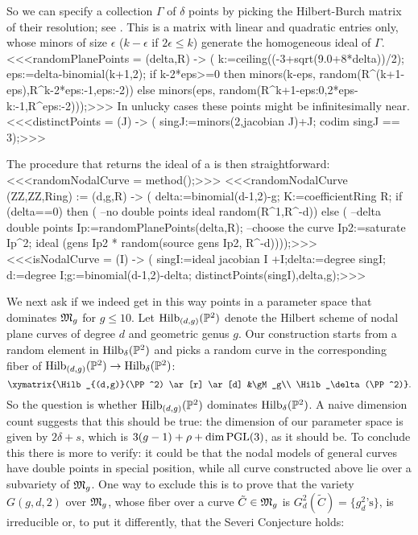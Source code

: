 \noindent
So we can specify a collection $\Gamma$ of $\delta$ points by picking 
the Hilbert-Burch matrix of their resolution; see \cite[Thm 20.15]{CO:Ei}. 
This is a matrix with linear and quadratic entries only, 
whose minors of size $\epsilon$ ($k-\epsilon$ if $2\epsilon\leq k$) 
generate the homogeneous ideal of $\Gamma$.
<<<randomPlanePoints = (delta,R) -> (
     k:=ceiling((-3+sqrt(9.0+8*delta))/2);
     eps:=delta-binomial(k+1,2);
     if k-2*eps>=0 
     then minors(k-eps,
          random(R^(k+1-eps),R^{k-2*eps:-1,eps:-2}))
     else minors(eps,
          random(R^{k+1-eps:0,2*eps-k:-1},R^{eps:-2})));>>>
In unlucky cases these points might be infinitesimally near.
<<<distinctPoints = (J) -> (
     singJ:=minors(2,jacobian J)+J;
     codim singJ == 3);>>>

\medskip \noindent
The procedure that returns the ideal of a  is then straightforward: 
<<<randomNodalCurve = method();>>>
<<<randomNodalCurve (ZZ,ZZ,Ring) := (d,g,R) -> (
     delta:=binomial(d-1,2)-g;
     K:=coefficientRing R;
     if (delta==0) 
     then (     --no double points
          ideal random(R^1,R^{-d}))
     else (      --delta double points            
          Ip:=randomPlanePoints(delta,R);
          --choose the curve
          Ip2:=saturate Ip^2;
          ideal (gens Ip2 * random(source gens Ip2, R^{-d}))));>>>
<<<isNodalCurve = (I) -> (
     singI:=ideal jacobian I +I;delta:=degree singI;
     d:=degree I;g:=binomial(d-1,2)-delta;
     {distinctPoints(singI),delta,g});>>>

We next ask if we indeed get in this way points in a parameter space 
that dominates $\mathfrak M_g$ for $g \le 10$.
Let ${\rm{Hilb}}_{(d,g)}({\mathbb P}^2)$ denote the Hilbert scheme of nodal plane curves
of degree $d$ and geometric genus $g$.
Our construction starts from  a random element in ${\rm{Hilb}}_\delta({\mathbb P}^2)$ and picks 
a random curve in the corresponding fiber of 
${\rm{Hilb}}_{(d,g)}({\mathbb P}^2)\to{\rm{Hilb}}_\delta({\mathbb P}^2)$:
$$\xymatrix{\Hilb_{(d,g)}(\PP^2) \ar[r] \ar[d] &\gM_g\\ \Hilb_\delta(\PP^2)}.$$
So the question is whether ${\rm{Hilb}}_{(d,g)}({\mathbb P}^2)$ dominates ${\rm{Hilb}}_\delta({\mathbb P}^2)$.
A naive dimension count suggests that this should be true:
the dimension of our parameter space is given by $2\delta +s$, 
which is $3(g-1)+\rho+\dim\operatorname{PGL}(3)$, as it should be.
To conclude this there is more to verify: 
it could be that the nodal models of general curves have double points 
in special position, 
while all curve constructed above lie over a subvariety of $\mathfrak M_g$. 
One way to exclude this is to prove that the variety $G(g,d,2)$ over $\mathfrak M_g$,
whose fiber over a curve ${\tilde C}\in\mathfrak M_g$ is $G^2_d(\tilde C)=\{g^2_d\text{'s}\}$,
is irreducible or, to put it differently, that the Severi Conjecture holds:

